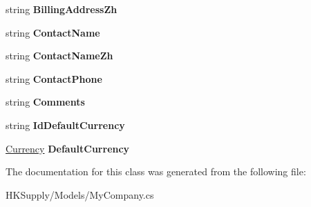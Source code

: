\begin{DoxyCompactItemize}
string {\bfseries Billing\+Address\+Zh}
\item 
\mbox{\label{class_h_k_supply_1_1_models_1_1_my_company_af181cfa6887b6ebf0dcc0b4d35cd0a69}} 
string {\bfseries Contact\+Name}
\item 
\mbox{\label{class_h_k_supply_1_1_models_1_1_my_company_add8edc45cdd5e2ae72aad60d32b66263}} 
string {\bfseries Contact\+Name\+Zh}
\item 
\mbox{\label{class_h_k_supply_1_1_models_1_1_my_company_af23f651f6f41697e2da6a56c02379baf}} 
string {\bfseries Contact\+Phone}
\item 
\mbox{\label{class_h_k_supply_1_1_models_1_1_my_company_ab06fad031086ae867c4a1c770572e4a0}} 
string {\bfseries Comments}
\item 
\mbox{\label{class_h_k_supply_1_1_models_1_1_my_company_a248ca9b754a31e23da0bef2bd517436f}} 
string {\bfseries Id\+Default\+Currency}
\item 
\mbox{\label{class_h_k_supply_1_1_models_1_1_my_company_aef2e2820c2f56fd976356821eefee4a6}} 
\mbox{\hyperlink{class_h_k_supply_1_1_models_1_1_currency}{Currency}} {\bfseries Default\+Currency}
\end{DoxyCompactItemize}


The documentation for this class was generated from the following file\+:\begin{DoxyCompactItemize}
\item 
H\+K\+Supply/\+Models/My\+Company.\+cs\end{DoxyCompactItemize}
